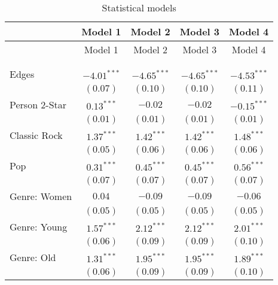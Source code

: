 
\begin{center}
\begin{longtable}{l c c c c}
\toprule
 & Model 1 & Model 2 & Model 3 & Model 4 \\
\midrule
\endfirsthead
\toprule
 & Model 1 & Model 2 & Model 3 & Model 4 \\
\midrule
\endhead
\bottomrule
\endfoot
\bottomrule
\multicolumn{5}{l}{\scriptsize{$^{***}p<0.001$; $^{**}p<0.01$; $^{*}p<0.05$}}\\
\caption{Statistical models}
\label{table:coefficients}
\endlastfoot \\
Edges                                  & $-4.01^{***}$ & $-4.65^{***}$ & $-4.65^{***}$ & $-4.53^{***}$ \\
                                       & $(0.07)$      & $(0.10)$      & $(0.10)$      & $(0.11)$      \\
Person 2-Star                          & $0.13^{***}$  & $-0.02$       & $-0.02$       & $-0.15^{***}$ \\
                                       & $(0.01)$      & $(0.01)$      & $(0.01)$      & $(0.01)$      \\
Classic Rock                           & $1.37^{***}$  & $1.42^{***}$  & $1.42^{***}$  & $1.48^{***}$  \\
                                       & $(0.05)$      & $(0.06)$      & $(0.06)$      & $(0.06)$      \\
Pop                                    & $0.31^{***}$  & $0.45^{***}$  & $0.45^{***}$  & $0.56^{***}$  \\
                                       & $(0.07)$      & $(0.07)$      & $(0.07)$      & $(0.07)$      \\
Genre: Women                           & $0.04$        & $-0.09$       & $-0.09$       & $-0.06$       \\
                                       & $(0.05)$      & $(0.05)$      & $(0.05)$      & $(0.05)$      \\
Genre: Young                           & $1.57^{***}$  & $2.12^{***}$  & $2.12^{***}$  & $2.01^{***}$  \\
                                       & $(0.06)$      & $(0.09)$      & $(0.09)$      & $(0.10)$      \\
Genre: Old                             & $1.31^{***}$  & $1.95^{***}$  & $1.95^{***}$  & $1.89^{***}$  \\
                                       & $(0.06)$      & $(0.09)$      & $(0.09)$      & $(0.10)$      \\

\end{longtable}
\end{center}
